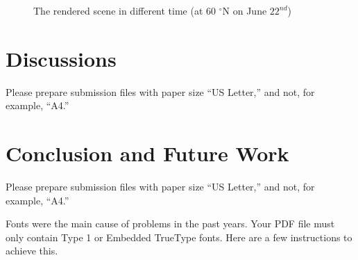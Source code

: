 \documentclass{article}
\begin{document}
\begin{figure}[h]
  \hfill
  \hfill

  \caption{The rendered scene in different time (at 60 $^{\circ}$N on June \(22^{nd}\))}
  \label{fig:L60N}
\end{figure}

\section{Discussions}
Please prepare submission files with paper size ``US Letter,'' and not, for
example, ``A4.''

\section{Conclusion and Future Work}
Please prepare submission files with paper size ``US Letter,'' and not, for
example, ``A4.''

Fonts were the main cause of problems in the past years. Your PDF file must only
contain Type 1 or Embedded TrueType fonts. Here are a few instructions to
achieve this.
\end{document}

